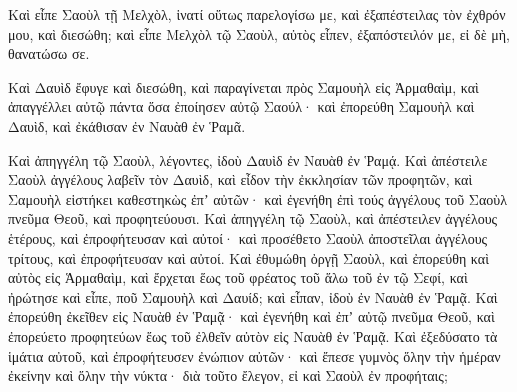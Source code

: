 {Καὶ εἶπε Σαοὺλ τῇ Μελχὸλ, ἱνατί οὕτως παρελογίσω με, καὶ ἐξαπέστειλας τὸν ἐχθρόν μου, καὶ διεσώθη; καὶ εἶπε Μελχὸλ τῷ Σαοὺλ, αὐτὸς εἶπεν, ἐξαπόστειλόν με, εἰ δὲ μὴ, θανατώσω σε.
\par }{\PP {}Καὶ Δαυὶδ ἔφυγε καὶ διεσώθη, καὶ παραγίνεται πρὸς Σαμουὴλ εἰς Ἀρμαθαὶμ, καὶ ἀπαγγέλλει αὐτῷ πάντα ὅσα ἐποίησεν αὐτῷ Σαούλ· καὶ ἐπορεύθη Σαμουὴλ καὶ Δαυὶδ, καὶ ἐκάθισαν ἐν Ναυὰθ ἐν Ῥαμᾶ.
\par }{\PP {}Καὶ ἀπηγγέλη τῷ Σαοὺλ, λέγοντες, ἰδοὺ Δαυὶδ ἐν Ναυὰθ ἐν Ῥαμᾴ.
Καὶ ἀπέστειλε Σαοὺλ ἀγγέλους λαβεῖν τὸν Δαυὶδ, καὶ εἶδον τὴν ἐκκλησίαν τῶν προφητῶν, καὶ Σαμουὴλ εἱστήκει καθεστηκὼς ἐπʼ αὐτῶν· καὶ ἐγενήθη ἐπὶ τούς ἀγγέλους τοῦ Σαοὺλ πνεῦμα Θεοῦ, καὶ προφητεύουσι.
Καὶ ἀπηγγέλη τῷ Σαοὺλ, καὶ ἀπέστειλεν ἀγγέλους ἑτέρους, καὶ ἐπροφήτευσαν καὶ αὐτοί· καὶ προσέθετο Σαοὺλ ἀποστεῖλαι ἀγγέλους τρίτους, καὶ ἐπροφήτευσαν καὶ αὐτοί.
Καὶ ἐθυμώθη ὀργῇ Σαοὺλ, καὶ ἐπορεύθη καὶ αὐτὸς εἰς Ἁρμαθαὶμ, καὶ ἔρχεται ἕως τοῦ φρέατος τοῦ ἅλω τοῦ ἐν τῷ Σεφί, καὶ ἠρώτησε καὶ εἶπε, ποῦ Σαμουὴλ καὶ Δαυίδ; καὶ εἶπαν, ἰδοὺ ἐν Ναυὰθ ἐν Ῥαμᾷ.
Καὶ ἐπορεύθη ἐκεῖθεν εἰς Ναυὰθ ἐν Ῥαμᾷ· καὶ ἐγενήθη καὶ ἐπʼ αὐτῷ πνεῦμα Θεοῦ, καὶ ἐπορεύετο προφητεύων ἕως τοῦ ἐλθεῖν αὐτὸν εἰς Ναυὰθ ἐν Ῥαμᾷ.
Καὶ ἐξεδύσατο τὰ ἱμάτια αὐτοῦ, καὶ ἐπροφήτευσεν ἐνώπιον αὐτῶν· καὶ ἔπεσε γυμνὸς ὅλην τὴν ἡμέραν ἐκείνην καὶ ὅλην τὴν νύκτα· διὰ τοῦτο ἔλεγον, εἰ καὶ Σαοὺλ ἐν προφήταις;

}
